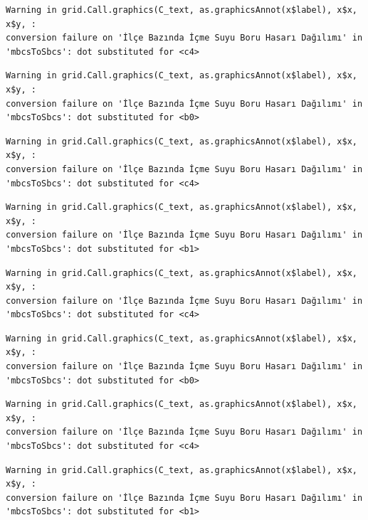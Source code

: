 \documentclass[
  11pt,
  a4paper,
  DIV=11,
  numbers=noendperiod]{scrartcl}
\begin{document}
\begin{verbatim}
Warning in grid.Call.graphics(C_text, as.graphicsAnnot(x$label), x$x, x$y, :
conversion failure on 'İlçe Bazında İçme Suyu Boru Hasarı Dağılımı' in
'mbcsToSbcs': dot substituted for <c4>
\end{verbatim}

\begin{verbatim}
Warning in grid.Call.graphics(C_text, as.graphicsAnnot(x$label), x$x, x$y, :
conversion failure on 'İlçe Bazında İçme Suyu Boru Hasarı Dağılımı' in
'mbcsToSbcs': dot substituted for <b0>
\end{verbatim}

\begin{verbatim}
Warning in grid.Call.graphics(C_text, as.graphicsAnnot(x$label), x$x, x$y, :
conversion failure on 'İlçe Bazında İçme Suyu Boru Hasarı Dağılımı' in
'mbcsToSbcs': dot substituted for <c4>
\end{verbatim}

\begin{verbatim}
Warning in grid.Call.graphics(C_text, as.graphicsAnnot(x$label), x$x, x$y, :
conversion failure on 'İlçe Bazında İçme Suyu Boru Hasarı Dağılımı' in
'mbcsToSbcs': dot substituted for <b1>
\end{verbatim}

\begin{verbatim}
Warning in grid.Call.graphics(C_text, as.graphicsAnnot(x$label), x$x, x$y, :
conversion failure on 'İlçe Bazında İçme Suyu Boru Hasarı Dağılımı' in
'mbcsToSbcs': dot substituted for <c4>
\end{verbatim}

\begin{verbatim}
Warning in grid.Call.graphics(C_text, as.graphicsAnnot(x$label), x$x, x$y, :
conversion failure on 'İlçe Bazında İçme Suyu Boru Hasarı Dağılımı' in
'mbcsToSbcs': dot substituted for <b0>
\end{verbatim}

\begin{verbatim}
Warning in grid.Call.graphics(C_text, as.graphicsAnnot(x$label), x$x, x$y, :
conversion failure on 'İlçe Bazında İçme Suyu Boru Hasarı Dağılımı' in
'mbcsToSbcs': dot substituted for <c4>
\end{verbatim}

\begin{verbatim}
Warning in grid.Call.graphics(C_text, as.graphicsAnnot(x$label), x$x, x$y, :
conversion failure on 'İlçe Bazında İçme Suyu Boru Hasarı Dağılımı' in
'mbcsToSbcs': dot substituted for <b1>
\end{verbatim}
\end{document}
